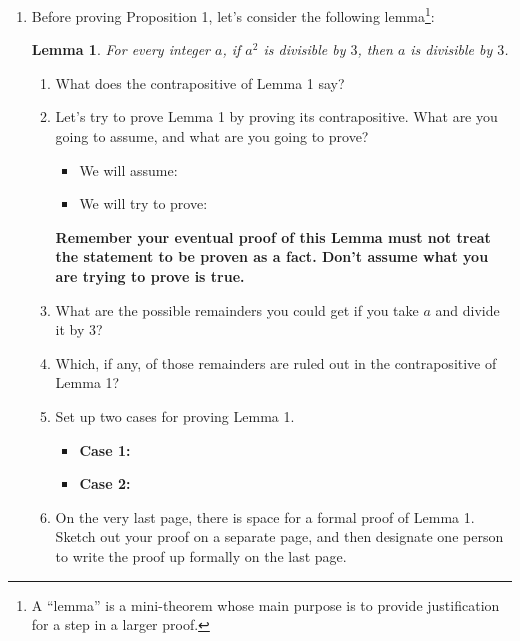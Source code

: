 \documentclass[11pt]{article}
\newtheorem{lemma}{Lemma}
\begin{document}
\begin{enumerate}
	\item Before proving Proposition 1, let's consider the following lemma\footnote{A ``lemma'' is a mini-theorem whose main purpose is to provide justification for a step in a larger proof.}: 
	
	\begin{lemma}
		For every integer $a$, if $a^2$ is divisible by $3$, then $a$ is divisible by $3$. 
	\end{lemma}
	
	\begin{enumerate}
		\item What does the contrapositive of Lemma 1 say? 
			\vspace{0.5in}

		\item Let's try to prove Lemma 1 by proving its contrapositive. What are you going to assume, and what are you going to prove? 
		\begin{itemize}
			\item We will assume: 
			\item We will try to prove: 
		\end{itemize}
		
		\textbf{Remember your eventual proof of this Lemma must not treat the statement to be proven as a fact. Don't assume what you are trying to prove is true. }
		
		\item What are the possible remainders you could get if you take $a$ and divide it by $3$? 
		
			\vspace{0.5in}

		\item Which, if any, of those remainders are ruled out in the contrapositive of Lemma 1? 
		
		\vspace{0.5in}
		
		\item Set up two cases for proving Lemma 1. 
		
		\begin{itemize}
			\item \textbf{Case 1:} 
			\item \textbf{Case 2:} 
		\end{itemize}
		
		\item On the very last page, there is space for a formal proof of Lemma 1. Sketch out your proof on a separate page, and then designate one person to write the proof up formally on the last page. 
	\end{enumerate}
	

\end{enumerate}
\end{document}
